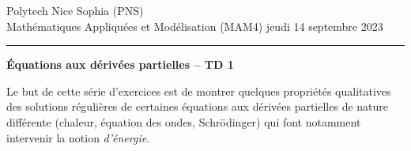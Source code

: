 \documentclass[12pt,a4paper]{article}
\begin{document}
 \hfill Polytech Nice Sophia (PNS)\\
\noindent Math\'ematiques Appliqu\'ees et Mod\'elisation (MAM4) \hfill jeudi 14 septembre 2023 \\

\hrule

\bigskip

\begin{center}{\bf \'Equations aux d\'eriv\'ees partielles --
TD 1}\end{center}

\bigskip

Le but de cette s\'erie d'exercices est de montrer quelques
propri\'et\'es qualitatives des solutions r\'eguli\`eres de certaines \'equations aux d\'eriv\'ees
partielles de nature diff\'erente (chaleur, \'equation des ondes, Schr\"odinger) qui font notamment intervenir la notion {\it d'\'energie}.
\end{document}
